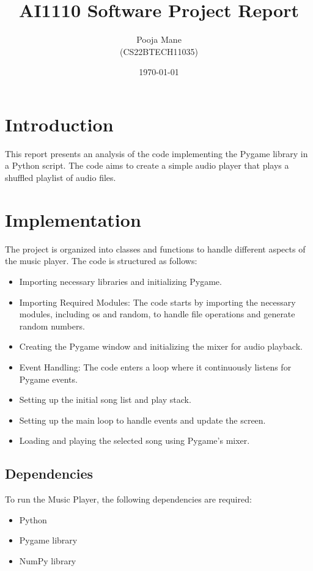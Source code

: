 \documentclass[journal,12pt,twocolumn]{IEEEtran}
\title{AI1110 Software Project Report}
\author{Pooja Mane\\ (CS22BTECH11035)}
\date{\today}
\begin{document}
\maketitle

\section{Introduction}
This report presents an analysis of the code implementing the Pygame library in a Python script. The code aims to create a simple audio player that plays a shuffled playlist of audio files. 

\section{Implementation}
The project is organized into classes and functions to handle different aspects of the music player. The code is structured as follows:

\begin{itemize}
\item Importing necessary libraries and initializing Pygame.
\item Importing Required Modules: The code starts by importing the necessary modules, including os and random, to handle file operations and generate random numbers.
\item Creating the Pygame window and initializing the mixer for audio playback.
\item Event Handling: The code enters a  loop where it continuously listens for Pygame events. 
\item Setting up the initial song list and play stack.
\item Setting up the main loop to handle events and update the screen.
\item Loading and playing the selected song using Pygame's mixer.
\end{itemize}

\subsection{Dependencies}
To run the Music Player, the following dependencies are required:

\begin{itemize}
\item Python 
\item Pygame library
\item NumPy library
\end{itemize}
\end{document}
